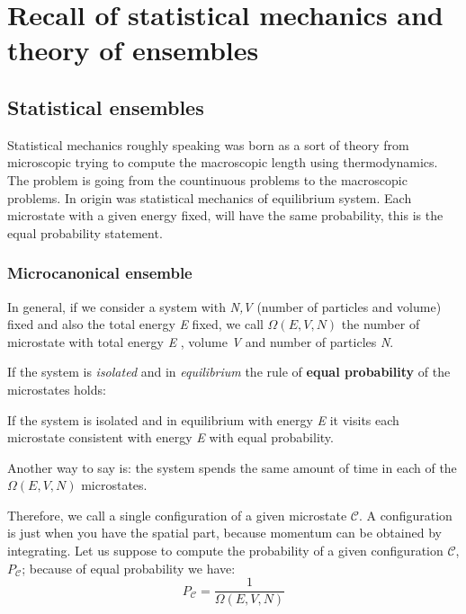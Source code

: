 \documentclass[../../Main/Main.tex]{subfiles}
\begin{document}
\chapter{Recall of statistical mechanics and theory of ensembles}

\section{Statistical ensembles}
Statistical mechanics roughly speaking was born as a sort of theory from microscopic trying to compute the macroscopic length using thermodynamics. The problem is going from the countinuous problems to the macroscopic problems. In origin was statistical mechanics of equilibrium system. Each microstate with a given energy fixed, will have the same probability, this is the equal probability statement.

\subsection{Microcanonical ensemble}
In general, if we consider a system with \emph{N,V} (number of particles and volume) fixed and also the total energy \emph{E} fixed, we call \( \Omega (E,V,N) \)  the number of microstate with total energy \emph{E} , volume \emph{V} and number of particles \emph{N}.

If the system is \emph{isolated} and in \emph{equilibrium} the rule of \textbf{equal probability} of the microstates holds:
\begin{orangebox}
If the system is isolated and in equilibrium with energy \emph{E} it visits each microstate consistent with energy \emph{E} with equal probability.
\end{orangebox}
Another way to say is: the system spends the same amount of time in each of the \( \Omega (E,V,N) \) microstates.

Therefore, we call  a single configuration of a given microstate \( \mathcal{C}  \). A configuration is just when you have the spatial part, because momentum can be obtained by integrating.
Let us suppose to compute the probability of a given configuration \( \mathcal{C}  \), \( P_{\mathcal{C}} \); because of equal probability we have:
\begin{equation}
  P_{\mathcal{C}} = \frac{1}{\Omega (E,V,N)}
  \label{eq:}
\end{equation}
\end{document}

